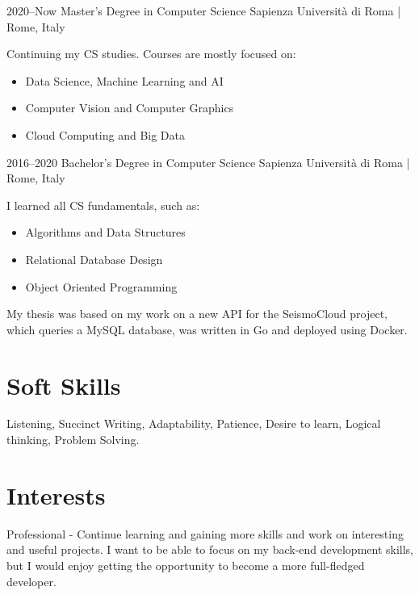 \documentclass[]{cv-style}          %
\begin{document}
\begin{entrylist}
\entry
{2020--Now}
{Master's Degree in Computer Science}
{Sapienza Università di Roma | Rome, Italy}
{Continuing my CS studies. Courses are mostly focused on: 
\begin{itemize}
    \item Data Science, Machine Learning and AI
    \item Computer Vision and Computer Graphics
    \item Cloud Computing and Big Data
\end{itemize}
}
\entry
{2016--2020}
{Bachelor's Degree in Computer Science}
{Sapienza Università di Roma | Rome, Italy}
{I learned all CS fundamentals, such as:
\begin{itemize}
    \item Algorithms and Data Structures
    \item Relational Database Design
    \item Object Oriented Programming
\end{itemize}
My thesis was based on my work on a new API for the SeismoCloud project, which queries a MySQL database, was written in Go and deployed using Docker.
}
{\vspace{-0.6cm}}
\end{entrylist}


\section{Soft Skills}
  \vspace{-0.4cm}
Listening, 
Succinct Writing,
Adaptability,
Patience,
Desire to learn,
Logical thinking,
Problem Solving.
\vspace{-0.6cm}
\section{Interests}

\begin{entrylist}
\entry
{Professional}
{- {\normalfont 
Continue learning and gaining more skills and work on interesting and useful projects. I want to be able to focus on my back-end development skills, but I would enjoy getting the opportunity to become a more full-fledged developer.}}
{}
{\vspace{-0.5cm}}
\end{entrylist}
\end{document}
